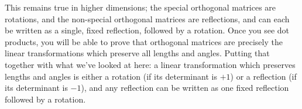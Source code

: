 \documentclass{article}
\begin{document}
\begin{enumerate}
\begin{enumerate}
			This remains true in higher dimensions; the special orthogonal matrices are rotations, and the non-special orthogonal matrices are reflections, and can each be written as a single, fixed reflection, followed by a rotation. Once you see dot products, you will be able to prove that orthogonal matrices are precisely the linear transformations which preserve all lengths and angles. Putting that together with what we've looked at here: a linear transformation which preserves lengths and angles is either a rotation (if its determinant is $+1$) or a reflection (if its determinant is $-1$), and any reflection can be written as one fixed reflection followed by a rotation.
		\end{enumerate}
\end{enumerate}
\end{document}

